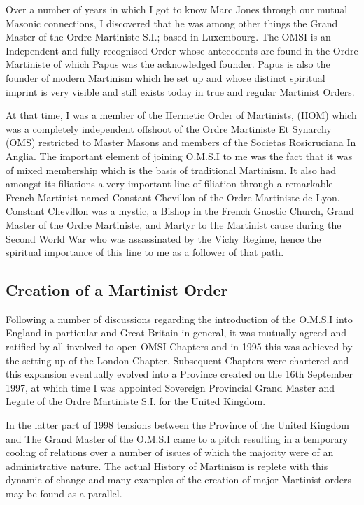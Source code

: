 Over a number of years in which I got to know Marc Jones through our mutual Masonic
connections, I discovered that he was among other things the Grand Master of the Ordre Martiniste
S.I.; based in Luxembourg. The OMSI is an Independent and fully recognised Order whose
antecedents are found in the Ordre Martiniste of which Papus was the acknowledged founder.
Papus is also the founder of modern Martinism which he set up and whose distinct spiritual
imprint is very visible and still exists today in true and regular Martinist Orders.

At that time, I was a member of the Hermetic Order of Martinists, (HOM) which was a completely
independent offshoot of the Ordre Martiniste Et Synarchy (OMS) restricted to Master Masons and
members of the Societas Rosicruciana In Anglia. The important element of joining O.M.S.I to me
was the fact that it was of mixed membership which is the basis of traditional Martinism. It also
had amongst its filiations a very important line of filiation through a remarkable French Martinist
named Constant Chevillon of the Ordre Martiniste de Lyon. Constant Chevillon was a mystic, a
Bishop in the French Gnostic Church, Grand Master of the Ordre Martiniste, and Martyr to the
Martinist cause during the Second World War who was assassinated by the Vichy Regime, hence
the spiritual importance of this line to me as a follower of that path.

\subsection{Creation of a Martinist Order}

Following a number of discussions regarding the introduction of the O.M.S.I into England in
particular and Great Britain in general, it was mutually agreed and ratified by all involved to open
OMSI Chapters and in 1995 this was achieved by the setting up of the London Chapter.
Subsequent Chapters were chartered and this expansion eventually evolved into a Province created
on the 16th September 1997, at which time I was appointed Sovereign Provincial Grand Master
and Legate of the Ordre Martiniste S.I. for the United Kingdom.

In the latter part of 1998 tensions between the Province of the United Kingdom and The Grand
Master of the O.M.S.I came to a pitch resulting in a temporary cooling of relations over a number
of issues of which the majority were of an administrative nature. The actual History of Martinism
is replete with this dynamic of change and many examples of the creation of major Martinist
orders may be found as a parallel.

